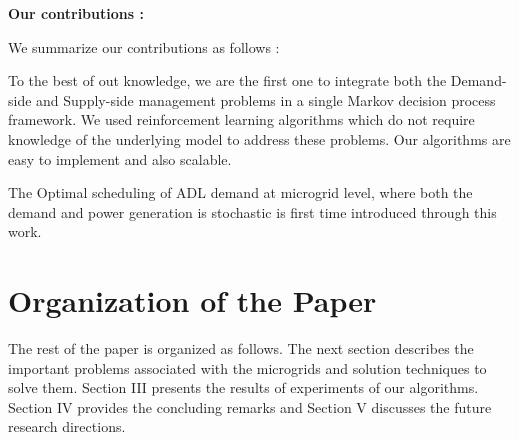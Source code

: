 
 

\textbf{Our contributions :}
\begin{inparaenum}[\bfseries (i)]
We summarize our contributions as follows :\\
\item To the best of out knowledge, we are the first one to integrate both the Demand-side and Supply-side management problems  in a single Markov decision process framework. We used reinforcement learning algorithms which do not require knowledge of the underlying model to address these problems. Our algorithms are easy to implement and also scalable.\\
\item The Optimal scheduling of ADL demand at microgrid level, where both the demand and power generation is stochastic is first time introduced through this work. \\    
\end{inparaenum}
\section*{Organization of the Paper}	
The rest of the paper is organized as follows. The next section describes the important problems associated with the microgrids and solution techniques to solve them. Section III presents the results of experiments of our algorithms. Section IV provides the concluding remarks and Section V discusses the future research directions.